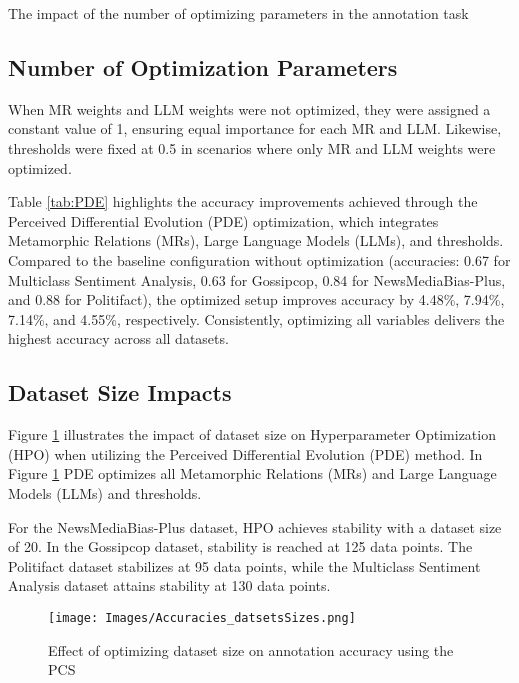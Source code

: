 \begin{table}[t]
\centering%
\caption{The impact of the number of optimizing parameters in the annotation task}
\label{tab:PDE}
\vskip 0.15in

{

}
\vskip -0.1in
\end{table}

\subsection{Number of Optimization Parameters}When MR weights and LLM weights were not optimized, they were assigned a constant value of 1, ensuring equal importance for each MR and LLM. Likewise, thresholds were fixed at 0.5 in scenarios where only MR and LLM weights were optimized. 

Table \ref{tab:PDE} highlights the accuracy improvements achieved through the Perceived Differential Evolution (PDE) optimization, which integrates Metamorphic Relations (MRs), Large Language Models (LLMs), and thresholds. Compared to the baseline configuration without optimization (accuracies: 0.67 for Multiclass Sentiment Analysis, 0.63 for Gossipcop, 0.84 for NewsMediaBias-Plus, and 0.88 for Politifact), the optimized setup improves accuracy by 4.48\%, 7.94\%, 7.14\%, and 4.55\%, respectively. Consistently, optimizing all variables delivers the highest accuracy across all datasets.


\subsection{Dataset Size Impacts}
Figure \ref{fig:optimizing-datasetsize} illustrates the impact of dataset size on Hyperparameter Optimization (HPO) when utilizing the Perceived Differential Evolution (PDE) method. In Figure \ref{fig:optimizing-datasetsize} PDE optimizes all Metamorphic Relations (MRs) and Large Language Models (LLMs) and thresholds.

For the NewsMediaBias-Plus dataset, HPO achieves stability with a dataset size of 20. In the Gossipcop dataset, stability is reached at 125 data points. The Politifact dataset stabilizes at 95 data points, while the Multiclass Sentiment Analysis dataset attains stability at 130 data points.
\begin{figure}[h]
  \centering
  \texttt{[image: Images/Accuracies\_datsetsSizes.png]} 
  \caption{Effect of optimizing dataset size on annotation accuracy using the PCS}
    \label{fig:optimizing-datasetsize}
\end{figure}

